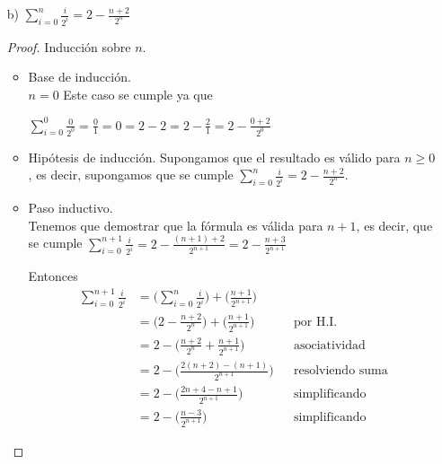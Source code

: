 \documentclass[letterpaper,11pt]{article}
\begin{document}
\begin{enumerate}
\begin{itemize}
        \item[b)] $∑_{i=0}^{n}\frac{i}{2^{i}} = 2 - \frac{n + 2}{2^{n}}$
        \begin{proof}
            Inducción sobre $n$. 

            \begin{itemize}
                \item Base de inducción. \\ 
                $n = 0$ Este caso se cumple ya que 

                $∑_{i=0}^{0} \frac{0}{2^{0}} = \frac{0}{1} = 0 =
                2 - 2 = 2 - \frac{2}{1}= 2 - \frac{0+2}{2^{0}}$

                \item Hipótesis de inducción. Supongamos que el resultado es 
                válido para $n \geq 0$, es decir, supongamos que se cumple 
                $∑_{i=0}^{n}\frac{i}{2^{i}} = 2 - \frac{n + 2}{2^{n}}$.

                \item Paso inductivo. \\ 
                Tenemos que demostrar que la fórmula es válida para $n + 1$, es 
                decir, que se cumple $∑_{i=0}^{n+1} \frac{i}{2^{i}} = 
                2 - \frac{(n+1) + 2}{2^{n+1}} = 2 - \frac{n+3}{2^{n+1}}$

                Entonces 
                \begin{align*}
                    ∑_{i=0}^{n+1} \frac{i}{2^{i}}
                    &= \bigg (∑_{i=0}^{n}\frac{i}{2^{i}} \bigg ) + 
                    \bigg (\frac{n+1}{2^{n+1}} \bigg) \\ 
                    &= \bigg (2 - \frac{n+2}{2^{n}} \bigg) + 
                    \bigg (\frac{n+1}{2^{n+1}} \bigg) 
                    && \text{por H.I.} \\ 
                    &= 2 - \bigg(\frac{n+2}{2^{n}} + \frac{n+1}{2^{n+1}} \bigg)
                    && \text{asociatividad} \\ 
                    &= 2 - \bigg( \frac{2(n+2) - (n+1)}{2^{n+1}} \bigg)
                    && \text{resolviendo suma} \\ 
                    &= 2 - \bigg(\frac{2n + 4 - n + 1}{2^{n+1}} \bigg)
                    && \text{simplificando} \\ 
                    &= 2 - \bigg( \frac{n - 3}{2^{n+1}}\bigg)
                    && \text{simplificando}
                \end{align*}
            \end{itemize}
        \end{proof}
    \end{itemize}


\end{enumerate}
\end{document}
